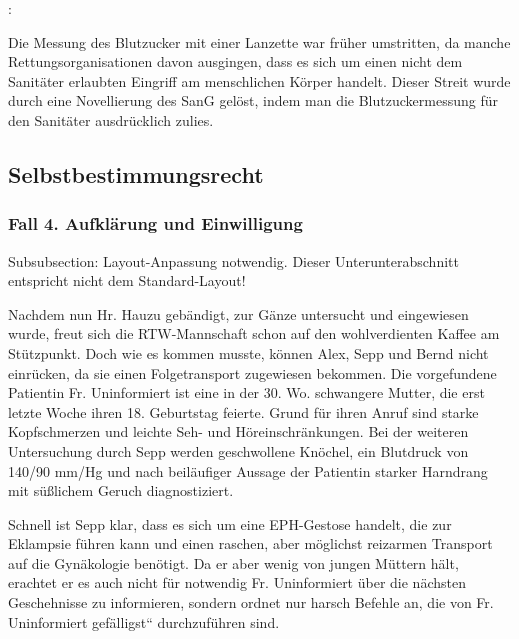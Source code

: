 :

Die Messung des Blutzucker mit einer Lanzette war fr\"uher umstritten,
da manche Rettungsorganisationen davon ausgingen, dass es sich um einen
nicht dem Sanitäter erlaubten Eingriff am menschlichen K\"orper
handelt. Dieser Streit wurde durch eine Novellierung des SanG gel\"ost,
indem man die Blutzuckermessung f\"ur den Sanitäter ausdr\"ucklich
zulies.


\subsection{Selbstbestimmungsrecht}

\subsubsection{Fall 4. Aufklärung und Einwilligung}
\begin{anfxwarning}[author=GABS]{Subsubsection: Layout-Anpassung notwendig.}
Dieser Unterunterabschnitt entspricht nicht dem Standard-Layout!
\end{anfxwarning}
\label{jus-fall-aufklaerung}


Nachdem nun Hr. Hauzu gebändigt, zur Gänze untersucht und
eingewiesen wurde, freut sich die RTW-Mannschaft schon auf den
wohlverdienten Kaffee am St\"utzpunkt. Doch wie es kommen musste,
k\"onnen Alex, Sepp und Bernd nicht einr\"ucken, da sie einen
Folgetransport zugewiesen bekommen. Die vorgefundene
Patientin Fr. Uninformiert ist eine in der 30. Wo.
schwangere Mutter, die erst letzte Woche ihren 18. Geburtstag feierte. Grund f\"ur ihren Anruf sind starke
Kopfschmerzen und leichte Seh- und H\"oreinschränkungen. Bei der
weiteren Untersuchung durch Sepp werden geschwollene Kn\"ochel, ein
Blutdruck von 140/90 mm/Hg und nach beiläufiger Aussage der
Patientin starker Harndrang mit s\"u{\ss}lichem Geruch
diagnostiziert.

Schnell ist Sepp klar, dass es sich um eine  EPH-Gestose handelt, die zur
Eklampsie f\"uhren kann und einen raschen, aber m\"oglichst reizarmen
Transport auf die Gynäkologie ben\"otigt. Da er aber wenig von jungen
M\"uttern hält, erachtet er es auch nicht f\"ur notwendig Fr.
Uninformiert \"uber die nächsten Geschehnisse zu informieren, sondern
ordnet nur harsch Befehle an, die von Fr. Uninformiert
{\quotedblbase}gefälligst{\textquotedblleft} durchzuf\"uhren sind. 

